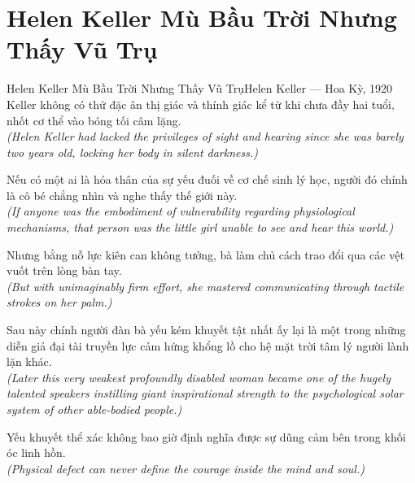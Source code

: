 \section{Helen Keller Mù Bầu Trời Nhưng Thấy Vũ Trụ}
\begin{truyen}{Helen Keller Mù Bầu Trời Nhưng Thấy Vũ Trụ}{Helen Keller --- Hoa Kỳ, 1920}
 Keller không có thứ đặc ân thị giác và thính giác kể từ khi chưa đầy hai tuổi, nhốt cơ thể vào bóng tối câm lặng.\\[4pt]
\textit{(Helen Keller had lacked the privileges of sight and hearing since she was barely two years old, locking her body in silent darkness.)}

Nếu có một ai là hóa thân của sự yếu đuối về cơ chế sinh lý học, người đó chính là cô bé chẳng nhìn và nghe thấy thế giới này.\\[4pt]
\textit{(If anyone was the embodiment of vulnerability regarding physiological mechanisms, that person was the little girl unable to see and hear this world.)}

Nhưng bằng nỗ lực kiên can không tưởng, bà làm chủ cách trao đổi qua các vệt vuốt trên lòng bàn tay.\\[4pt]
\textit{(But with unimaginably firm effort, she mastered communicating through tactile strokes on her palm.)}

Sau này chính người đàn bà yếu kém khuyết tật nhất ấy lại là một trong những diễn giả đại tài truyền lực cảm hứng khổng lồ cho hệ mặt trời tâm lý người lành lặn khác.\\[4pt]
\textit{(Later this very weakest profoundly disabled woman became one of the hugely talented speakers instilling giant inspirational strength to the psychological solar system of other able-bodied people.)}

\end{truyen}
\begin{baihoc}
  Yếu khuyết thể xác không bao giờ định nghĩa được sự dũng cảm bên trong khối óc linh hồn.\\[4pt]
  \textit{(Physical defect can never define the courage inside the mind and soul.)}
\end{baihoc}

